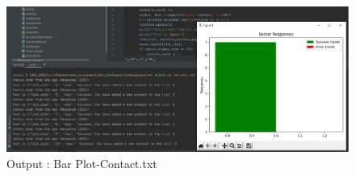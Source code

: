 \documentclass{resources/WeSTassignment}
\begin{document}
		\begin{figure}[ht]
    			\centering
    			\includegraphics[scale=0.4]{resources/finalContactBarPlot.JPG}
    			\caption{Output : Bar Plot-Contact.txt}
    			\label{fig: BarPlot - Contacts.txt}
\end{figure}
\end{document}
